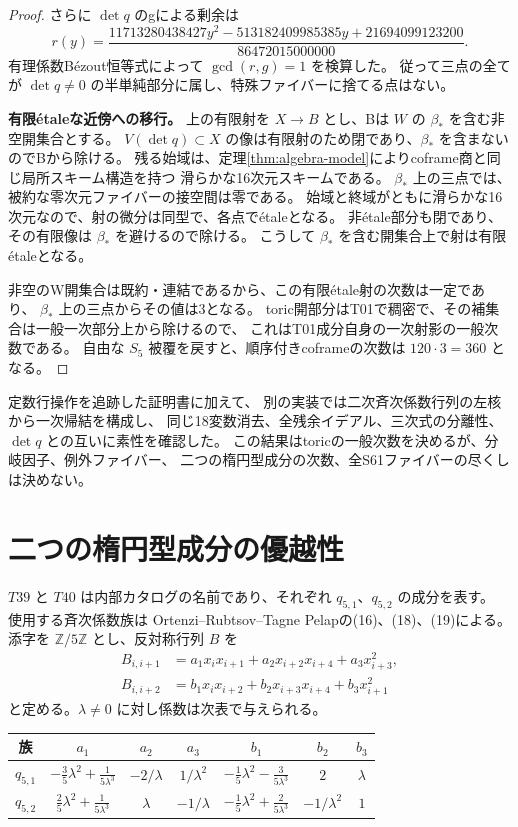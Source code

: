 \documentclass[11pt,a4paper]{ltjsarticle}
\theoremstyle{remark}
\begin{document}
\begin{proof}
さらに $\det q$ のgによる剰余は
\[
 r(y)=\frac{11713280438427y^2-513182409985385y+21694099123200}
                {86472015000000}.
\]
有理係数B\'ezout恒等式によって $\gcd(r,g)=1$ を検算した。
従って三点の全てが $\det q\ne0$ の半単純部分に属し、特殊ファイバーに捨てる点はない。

\textbf{有限\'etaleな近傍への移行。}
上の有限射を $X\to B$ とし、Bは $W$ の $\beta_*$ を含む非空開集合とする。
$V(\det q)\subset X$ の像は有限射のため閉であり、$\beta_*$ を含まないのでBから除ける。
残る始域は、定理\ref{thm:algebra-model}によりcoframe商と同じ局所スキーム構造を持つ
滑らかな16次元スキームである。
$\beta_*$ 上の三点では、被約な零次元ファイバーの接空間は零である。
始域と終域がともに滑らかな16次元なので、射の微分は同型で、各点で\'etaleとなる。
非\'etale部分も閉であり、その有限像は $\beta_*$ を避けるので除ける。
こうして $\beta_*$ を含む開集合上で射は有限\'etaleとなる。

非空のW開集合は既約・連結であるから、この有限\'etale射の次数は一定であり、
$\beta_*$ 上の三点からその値は3となる。
toric開部分はT01で稠密で、その補集合は一般一次部分上から除けるので、
これはT01成分自身の一次射影の一般次数である。
自由な $S_5$ 被覆を戻すと、順序付きcoframeの次数は $120\cdot3=360$ となる。
\end{proof}

定数行操作を追跡した証明書\cite{degree-certificate}に加えて、
別の実装\cite{degree-review}では二次斉次係数行列の左核から一次帰結を構成し、
同じ18変数消去、全残余イデアル、三次式の分離性、$\det q$ との互いに素性を確認した。
この結果はtoricの一般次数を決めるが、分岐因子、例外ファイバー、
二つの楕円型成分の次数、全S61ファイバーの尽くしは決めない。

\section{二つの楕円型成分の優越性}\label{sec:elliptic}
$T39$ と $T40$ は内部カタログの名前であり、それぞれ $q_{5,1}$、$q_{5,2}$ の成分を表す。
使用する斉次係数族は Ortenzi--Rubtsov--Tagne Pelap\cite{ortp}の(16)、(18)、(19)による。
添字を $\mathbb Z/5\mathbb Z$ とし、反対称行列 $B$ を
\begin{align}
 B_{i,i+1}&=a_1x_ix_{i+1}+a_2x_{i+2}x_{i+4}+a_3x_{i+3}^2,\nonumber\\
 B_{i,i+2}&=b_1x_ix_{i+2}+b_2x_{i+3}x_{i+4}+b_3x_{i+1}^2\label{eq:elliptic-family}
\end{align}
と定める。$\lambda\ne0$ に対し係数は次表で与えられる。
\begin{center}
\small
\begin{tabular}{@{}c*{6}{c}@{}}
\toprule
族 & $a_1$ & $a_2$ & $a_3$ & $b_1$ & $b_2$ & $b_3$\\\midrule
$q_{5,1}$ & $-\frac35\lambda^2+\frac1{5\lambda^3}$ & $-2/\lambda$ & $1/\lambda^2$
& $-\frac15\lambda^2-\frac3{5\lambda^3}$ & $2$ & $\lambda$\\[2mm]
$q_{5,2}$ & $\frac25\lambda^2+\frac1{5\lambda^3}$ & $\lambda$ & $-1/\lambda$
& $-\frac15\lambda^2+\frac2{5\lambda^3}$ & $-1/\lambda^2$ & $1$\\
\bottomrule
\end{tabular}
\end{center}
\end{document}

